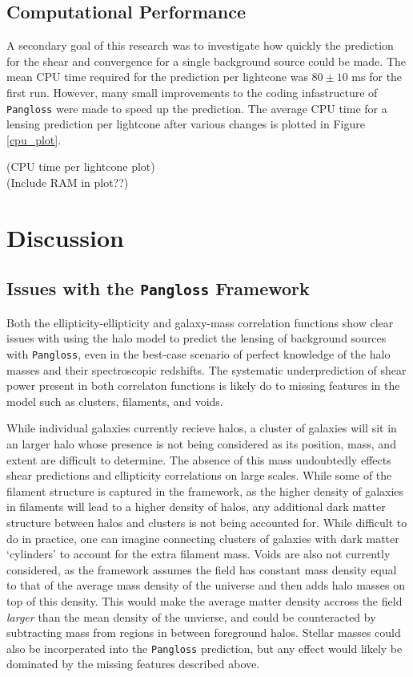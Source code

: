 \documentclass[%
 reprint,
 amsmath,amssymb,
 aps,nofootinbib
]{revtex4-1}
\begin{document}
\subsection*{Computational Performance}

A secondary goal of this research was to investigate how quickly the prediction for the shear and convergence for a single background source could be made. The mean CPU time required for the prediction per lightcone was ${80\pm10}$ ms for the first run. However, many small improvements to the coding infastructure of \texttt{Pangloss} were made to speed up the prediction. The average CPU time for a lensing prediction per lightcone after various changes is plotted in Figure \ref{cpu_plot}.

(CPU time per lightcone plot)\\
(Include RAM in plot??)

\section{Discussion}

\subsection*{Issues with the \texttt{Pangloss} Framework}

Both the ellipticity-ellipticity and galaxy-mass correlation functions show clear issues with using the halo model to predict the lensing of background sources with \texttt{Pangloss}, even in the best-case scenario of perfect knowledge of the halo masses and their spectroscopic redshifts. The systematic underprediction of shear power present in both correlaton functions is likely do to missing features in the model such as clusters, filaments, and voids. 

While individual galaxies currently recieve halos, a cluster of galaxies will sit in an larger halo whose presence is not being considered as its position, mass, and extent are difficult to determine. The absence of this mass undoubtedly effects shear predictions and ellipticity correlations on large scales. While some of the filament structure is captured in the framework, as the higher density of galaxies in filaments will lead to a higher density of halos, any additional dark matter structure between halos and clusters is not being accounted for. While difficult to do in practice, one can imagine connecting clusters of galaxies with dark matter `cylinders' to account for the extra filament mass. Voids are also not currently considered, as the framework assumes the field has constant mass density equal to that of the average mass density of the universe and then adds halo masses on top of this density. This would make the average matter density accross the field \textit{larger} than the mean density of the unvierse, and could be counteracted by subtracting mass from regions in between foreground halos. Stellar masses could also be incorperated into the \texttt{Pangloss} prediction, but any effect would likely be dominated by the missing features described above.
\end{document}
